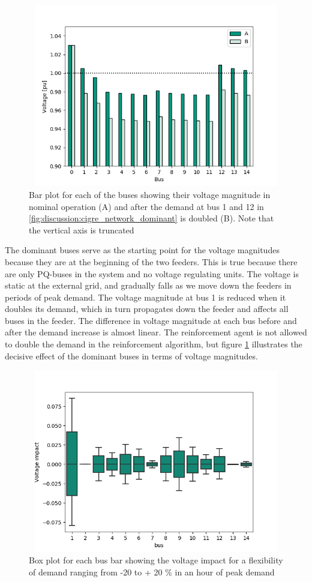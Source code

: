 \documentclass[class=book, crop=false, 11pt]{standalone}
\begin{document}
\begin{figure}[ht!]
    \center
\includegraphics[height=8cm, width=12cm]{figures/double_large_load.png}
    \caption[size = 9]{Bar plot for each of the buses showing their voltage magnitude in nominal operation (A) and after the demand at bus 1 and 12 in \ref{fig:discussion:cigre_network_dominant} is doubled (B). Note that the vertical axis is truncated}
    \label{fig:discussion:double_large_load}
\end{figure}
The dominant buses serve as the starting point for the voltage magnitudes because they are at the beginning of the two feeders. This is true because there are only PQ-buses in the system and no voltage regulating units. The voltage is static at the external grid, and gradually falls as we move down the feeders in periods of peak demand. The voltage magnitude at bus 1 is reduced when it doubles its demand, which in turn propagates down the feeder and affects all buses in the feeder. The difference in voltage magnitude at each bus before and after the demand increase is almost linear. The reinforcement agent is not allowed to double the demand in the reinforcement algorithm, but figure \ref{fig:discussion:double_large_load} illustrates the decisive effect of the dominant buses in terms of voltage magnitudes.

\begin{figure}[hb!]
    \center
\includegraphics[height=8cm, width=12cm]{figures/voltage_impact.png}
    \caption[size = 9]{Box plot for each bus bar showing the voltage impact for a flexibility of demand ranging from -20 to + 20 \% in an hour of peak demand}
    \label{fig:discussion:voltage_impact}
\end{figure}
\end{document}
